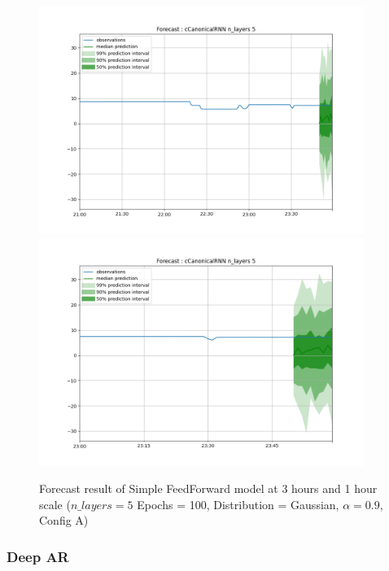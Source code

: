 \documentclass[a4paper, 12pt]{article}
\begin{document}
\begin{figure}[!h]
    \centering
    \includegraphics[width=400px]{plots/forecast/a/cCanonicalRNN/n_layers/5/180.png}
    \includegraphics[width=400px]{plots/forecast/a/cCanonicalRNN/n_layers/5/60.png}
    \caption{Forecast result of Simple FeedForward model at 3 hours and 1 hour scale ($n\_layers = 5$ Epochs = 100, Distribution = Gaussian, $\alpha = 0.9$, Config A)}
    \label{fig:canonicalrnn}
\end{figure}

\subsubsection{Deep AR} \label{comp_deepar}
\end{document}
